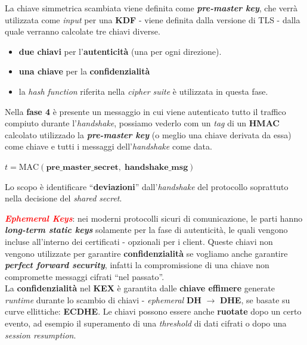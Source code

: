 \begin{flushleft}
    La chiave simmetrica scambiata viene definita come \textbf{\textit{pre-master key}}, che verrà utilizzata come \textit{input} per una \textbf{KDF} - viene definita dalla versione di TLS - dalla quale verranno calcolate tre chiavi diverse.
    \begin{itemize}[nosep]
        \item \textbf{due chiavi} per l'\textbf{autenticità} (una per ogni direzione).
        \item \textbf{una chiave} per la \textbf{confidenzialità}
        \item la \textit{hash function} riferita nella \textit{cipher suite} è utilizzata in questa fase.
    \end{itemize}

    Nella \textbf{fase 4} è presente un messaggio in cui viene autenticato tutto il traffico compiuto durante l'\textit{handshake}, possiamo vederlo com un \textit{tag} di un \textbf{HMAC} calcolato utilizzado la \textbf{\textit{pre-master key}} (o meglio una chiave derivata da essa) come chiave e tutti i messaggi dell'\textit{handshake} come data.

    {\centering
        $t = \text{MAC}(\mathbf{pre\_master\_secret}, \; \mathbf{handshake\_msg})$
    \par}

    Lo scopo è identificare ``\textbf{deviazioni}'' dall'\textit{handshake} del protocollo soprattuto nella decisione del \textit{shared secret}. 

    \smallskip

    \textcolor{red}{\textbf{\textit{Ephemeral Keys}}}: nei moderni protocolli sicuri di comunicazione, le parti hanno \textbf{\textit{long-term static keys}} solamente per la fase di autenticità, le quali vengono incluse all'interno dei certificati - opzionali per i client. Queste chiavi non vengono utilizzate per garantire \textbf{confidenzialità} se vogliamo anche garantire \textbf{\textit{perfect forward security}}, infatti la compromissione di una chiave non compromette messaggi cifrati ``nel passato''.  \\
    La \textbf{confidenzialità} nel \textbf{KEX} è garantita dalle \textbf{chiave effimere} generate \textit{runtime} durante lo scambio di chiavi - \textit{ephemeral} \textbf{DH} $\rightarrow$ \textbf{DHE}, se basate su curve ellittiche: \textbf{ECDHE}. Le chiavi possono essere anche \textbf{ruotate} dopo un certo evento, ad esempio il superamento di una \textit{threshold} di dati cifrati o dopo una \textit{session resumption}.
    

\end{flushleft}
